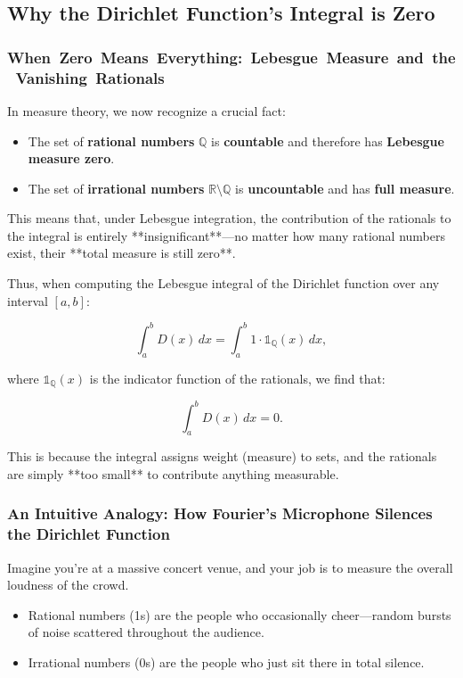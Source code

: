 \subsection{Why the Dirichlet Function's Integral is Zero}

\subsubsection{When Zero Means Everything: Lebesgue Measure and the Vanishing Rationals}

In measure theory, we now recognize a crucial fact:

\begin{itemize}
    \item The set of \textbf{rational numbers} \( \mathbb{Q} \) is \textbf{countable} and therefore has \textbf{Lebesgue measure zero}.
    \item The set of \textbf{irrational numbers} \( \mathbb{R} \setminus \mathbb{Q} \) is \textbf{uncountable} and has \textbf{full measure}.
\end{itemize}

This means that, under Lebesgue integration, the contribution of the rationals to the integral is entirely **insignificant**—no matter how many rational numbers exist, their **total measure is still zero**.

Thus, when computing the Lebesgue integral of the Dirichlet function over any interval \( [a, b] \):

\[
\int_a^b D(x) \,dx = \int_a^b 1 \cdot \mathbb{1}_{\mathbb{Q}}(x) \,dx,
\]

where \( \mathbb{1}_{\mathbb{Q}}(x) \) is the indicator function of the rationals, we find that:

\[
\int_a^b D(x) \,dx = 0.
\]

This is because the integral assigns weight (measure) to sets, and the rationals are simply **too small** to contribute anything measurable.

\subsubsection{An Intuitive Analogy: How Fourier’s Microphone Silences the Dirichlet Function}

Imagine you’re at a massive concert venue, and your job is to measure the overall loudness of the crowd.

\begin{itemize}
    \item Rational numbers (1s) are the people who occasionally cheer—random bursts of noise scattered throughout the audience.
    \item Irrational numbers (0s) are the people who just sit there in total silence.
\end{itemize}

